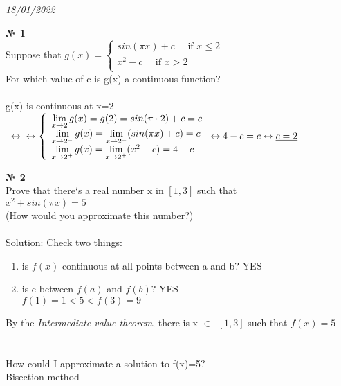 \documentclass[12pt]{article}
\newenvironment{task}[1][0]{\vspace{.5cm} {\textbf{№ #1} \vspace{.5cm}\\ }\large}{}
\begin{document}
\vspace{2cm}
{\hfill \textit{18/01/2022}\vspace{.5cm}\\}

\begin{task}[1]
Suppose that $g(x)= \left\{
\begin{array}{l}
sin(\pi x)+c\quad\text{ if } x \leq 2\\
x^2-c\quad \text{ if } x > 2\\
\end{array}
\right.$\\
For which value of c is g(x) a continuous function?\\
\vspace{.5cm}\\
g(x) is continuous at x=2 $\enspace \leftrightarrow\\ \vspace{.2cm} \leftrightarrow
\left\{ 
\begin{array}{l}
\lim\limits_{x \to 2} g(x)=g(2)=sin(\pi \cdot 2) + c = c\\
\lim\limits_{x \to 2^-} g(x) = \lim\limits_{x \to 2^-} (sin(\pi x) + c) = c\\
\lim\limits_{x \to 2^+} g(x) = \lim\limits_{x \to 2^+} (x^2 - c) = 4-c\\
\end{array}\right. \leftrightarrow 4-c=c \leftrightarrow \underline{c = 2}$
\end{task}

\begin{task}[2]
Prove that there`s a real number x in $[1, 3]$ such that\\ $x^2+sin(\pi x)=5$\\
(How would you approximate this number?)\\\\
Solution: Check two things:
\begin{enumerate}
	\item is $f(x)$ continuous at all points between a and b? YES
	\item is c between $f(a)$ and $f(b)$? YES - \\$f(1)=1<5<f(3)=9$
\end{enumerate}
By the \textit{Intermediate value theorem}, there is x $\in \enspace [1, 3]$ such that $f(x)=5$\\\\\\

How could I approximate a solution to f(x)=5?\\
Bisection method

\end{task}
\end{document}
